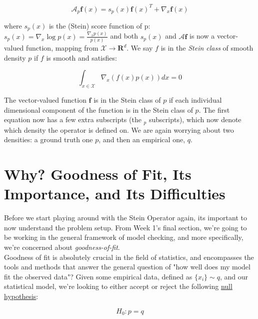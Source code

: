 \documentclass[12pt]{article}
\begin{document}
\begin{equation}
    \mathcal{A}_p\mathbf{f}(x) = s_p(x)\mathbf{f}(x)^T + \nabla_x \mathbf{f}(x) 
\end{equation}

\noindent where $s_p(x)$ is the (Stein) score function of p: $s_p(x) = \nabla_x \log p(x) = \frac{\nabla_x p(x)}{p(x)}$ and both $s_p(x)$ and $\mathcal{A}\mathbf{f}$ is now a vector-valued function, mapping from $\mathcal{X} \rightarrow \mathbf{R}^d$. We say $f$ is in the \textit{Stein class} of smooth density $p$ if $f$ is smooth and satisfies:


\begin{equation}
    \int_{x \in \mathcal{X}} \nabla_x (f(x)p(x))dx = 0
\end{equation} 

\noindent The vector-valued function $\mathbf{f}$ is in the Stein class of $p$ if each individual dimensional component of the function is in the Stein class of $p$. The first equation now has a few extra subscripts (the $_p$ subscripts), which now denote which density the operator is defined on. We are again worrying about two densities: a ground truth one $p$, and then an empirical one, $q$.

\section{Why? Goodness of Fit, Its Importance, and Its Difficulties}                                                                                                Before we start playing around with the Stein Operator again, its important to now understand the problem setup. From Week 1's final section, we're going to be working in the general framework of model checking, and more specifically, we're concerned about \textit{goodness-of-fit}. \\

\noindent Goodness of fit is absolutely crucial in the field of statistics, and encompasses the tools and methods that answer the general question of "how well does my model fit the observed data"? Given some empirical data, defined as $\{ x_i \} \sim q$, and our statistical model, we're looking to either accept or reject the following \href{https://www.statisticshowto.datasciencecentral.com/goodness-of-fit-test/}{null hypothesis}:

\begin{equation}
    H_0: p = q
\end{equation}
\end{document}
